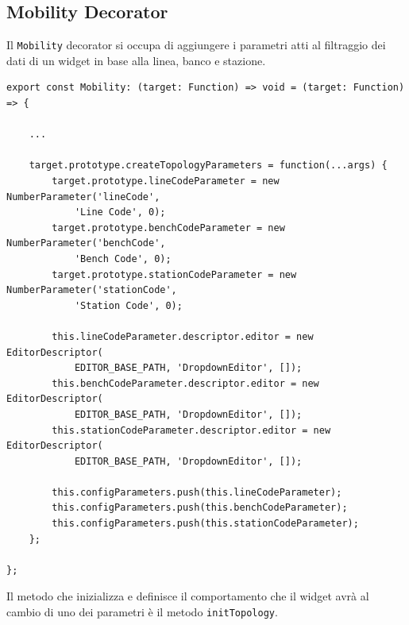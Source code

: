 \subsection{Mobility Decorator}
Il \verb|Mobility| decorator si occupa di aggiungere i parametri atti al filtraggio dei dati di un widget in base alla linea, banco e stazione.\\
\begin{lstlisting}[caption={Metodo di creazione dei parametri all'interno del decorator Mobility}, style=javaScriptCode]
export const Mobility: (target: Function) => void = (target: Function) => {

    ...

    target.prototype.createTopologyParameters = function(...args) {
        target.prototype.lineCodeParameter = new NumberParameter('lineCode', 
            'Line Code', 0);
        target.prototype.benchCodeParameter = new NumberParameter('benchCode', 
            'Bench Code', 0);
        target.prototype.stationCodeParameter = new NumberParameter('stationCode', 
            'Station Code', 0);

        this.lineCodeParameter.descriptor.editor = new EditorDescriptor(
            EDITOR_BASE_PATH, 'DropdownEditor', []);
        this.benchCodeParameter.descriptor.editor = new EditorDescriptor(
            EDITOR_BASE_PATH, 'DropdownEditor', []);
        this.stationCodeParameter.descriptor.editor = new EditorDescriptor(
            EDITOR_BASE_PATH, 'DropdownEditor', []);

        this.configParameters.push(this.lineCodeParameter);
        this.configParameters.push(this.benchCodeParameter);
        this.configParameters.push(this.stationCodeParameter);
    };

};
\end{lstlisting}
Il metodo che inizializza e definisce il comportamento che il widget avrà al cambio di uno dei parametri è il metodo \verb|initTopology|. \\
